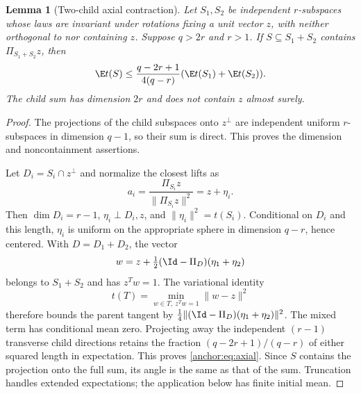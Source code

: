 \documentclass[11pt,oneside,openany,a4paper]{book}
\numberwithin{equation}{chapter}
\newtheorem{lemma}[theorem]{Lemma}
\theoremstyle{definition}
\theoremstyle{remark}
\begin{document}
\begin{lemma}[Two-child axial contraction]\label{anchor:lem:axial}
Let $S_1,S_2$ be independent $r$-subspaces whose laws are invariant under rotations fixing a unit vector $z$, with neither orthogonal to nor containing $z$. Suppose $q>2r$ and $r>1$. If $S\subseteq S_1+S_2$ contains $\Pi_{S_1+S_2}z$, then
\begin{equation}\label{anchor:eq:axial}
 \E t(S)\le\frac{q-2r+1}{4(q-r)}
                  (\E t(S_1)+\E t(S_2)).
\end{equation}
The child sum has dimension $2r$ and does not contain $z$ almost surely.
\end{lemma}
\begin{proof}
The projections of the child subspaces onto $z^\perp$ are independent uniform $r$-subspaces in dimension $q-1$, so their sum is direct. This proves the dimension and noncontainment assertions.

Let $D_i=S_i\cap z^\perp$ and normalize the closest lifts as
\[
 a_i=\frac{\Pi_{S_i}z}{\|\Pi_{S_i}z\|^2}=z+\eta_i.
\]
Then $\dim D_i=r-1$, $\eta_i\perp D_i,z$, and $\|\eta_i\|^2=t(S_i)$. Conditional on $D_i$ and this length, $\eta_i$ is uniform on the appropriate sphere in dimension $q-r$, hence centered. With $D=D_1+D_2$, the vector
\[
 w=z+\tfrac12(\Id-\Pi_D)(\eta_1+\eta_2)
\]
belongs to $S_1+S_2$ and has $z^Tw=1$. The variational identity
\[
 t(T)=\min_{w\in T,\ z^Tw=1}\|w-z\|^2
\]
therefore bounds the parent tangent by $\tfrac14\|(\Id-\Pi_D)(\eta_1+\eta_2)\|^2$. The mixed term has conditional mean zero. Projecting away the independent $(r-1)$ transverse child directions retains the fraction $(q-2r+1)/(q-r)$ of either squared length in expectation. This proves \eqref{anchor:eq:axial}. Since $S$ contains the projection onto the full sum, its angle is the same as that of the sum. Truncation handles extended expectations; the application below has finite initial mean.
\end{proof}
\end{document}
